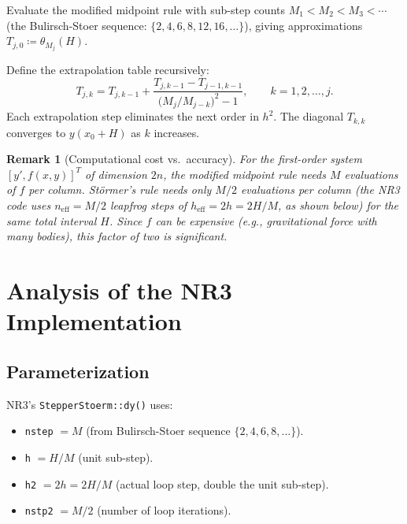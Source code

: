\documentclass[11pt]{article}
\newtheorem{remark}{Remark}
\begin{document}
Evaluate the modified midpoint rule with sub-step counts $M_1 < M_2 < M_3 < \cdots$
(the Bulirsch-Stoer sequence: $\{2, 4, 6, 8, 12, 16, \ldots\}$), giving
approximations $T_{j,0} \coloneqq \theta_{M_j}(H)$.

Define the extrapolation table recursively:
\begin{equation}
  T_{j,k} = T_{j,k-1} + \frac{T_{j,k-1} - T_{j-1,k-1}}
                              {\bigl(M_j / M_{j-k}\bigr)^2 - 1},
  \qquad k = 1, 2, \ldots, j.
\end{equation}
Each extrapolation step eliminates the next order in $h^2$.  The diagonal $T_{k,k}$
converges to $y(x_0 + H)$ as $k$ increases.

\begin{remark}[Computational cost vs.\ accuracy]
  For the first-order system $[y', f(x,y)]^T$ of dimension $2n$, the modified
  midpoint rule needs $M$ evaluations of $f$ per column.  Störmer's rule needs only
  $M/2$ evaluations per column (the NR3 code uses $n_\text{eff} = M/2$ leapfrog
  steps of $h_\text{eff} = 2h = 2H/M$, as shown below) for the same total interval
  $H$.  Since $f$ can be expensive (e.g., gravitational force with many bodies),
  this factor of two is significant.
\end{remark}

\section{Analysis of the NR3 Implementation}

\subsection{Parameterization}

NR3's \texttt{StepperStoerm::dy()} uses:
\begin{itemize}
  \item \texttt{nstep} $= M$ (from Bulirsch-Stoer sequence $\{2,4,6,8,\ldots\}$).
  \item \texttt{h} $= H/M$ (unit sub-step).
  \item \texttt{h2} $= 2h = 2H/M$ (actual loop step, double the unit sub-step).
  \item \texttt{nstp2} $= M/2$ (number of loop iterations).
\end{itemize}
\end{document}

